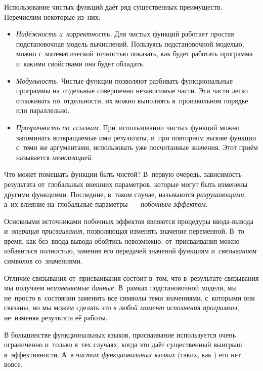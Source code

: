 Использование чистых функций даёт ряд существенных преимуществ. Перечислим некоторые из~них:

\begin{itemize}[--]
 \item \emph{Надёжность и~корректность.} Для чистых функций работает простая подстановочная модель вычислений. Пользуясь подстановочной моделью, можно с~математической точностью показать, как будет работать программа и~какими свойствами она будет обладать.

 \item \emph{Модульность.} Чистые функции позволяют разбивать функциональные программы на~отдельные совершенно независимые части. Эти части легко отлаживать по~отдельности, их можно выполнять в~произвольном порядке или параллельно.

 \item\label{memo1}\emph{Прозрачность по~ссылкам.} При~использовании чистых функций можно запоминать возвращаемые ими результаты, и~при повторном вызове функции с~теми же аргументами, использовать уже посчитанные значения. Этот приём называется \emph{мемоизацией}.
\end{itemize}

Что может помешать функции быть чистой? В~первую очередь, зависимость результата от~глобальных внешних параметров, которые могут быть изменены другими функциями. Последние, в~таком случае, называются \emph{разрушающими}, а~их влияние на~глобальные параметры~--- \emph{побочным эффектом}.

Основными источниками побочных эффектов являются процедуры ввода-вывода и~\emph{операция присваивания}, позволяющая изменять значение переменной. В~то время, как без~ввода-вывода обойтись невозможно, от~присваивания можно избавиться полностью, заменив его передачей значений функциям и~\emph{связыванием} символов со~значениями.

Отличие связывания от~присваивания состоит в~том, что в~результате связывания мы получаем \emph{неизменяемые данные}. В~рамках подстановочной модели, мы не~просто в~состоянии заменить все символы теми значениями, с~которыми они связаны, но мы можем сделать это \emph{в любой момент исполнения программы}, не~изменяя результата её работы.

В большинстве функциональных языков, присваивание используется очень ограниченно и~только в~тех случаях, когда это даёт существенный выигрыш в~эффективности. А~в \emph{чистых функциональных языках} (таких, как ) его нет вовсе.

